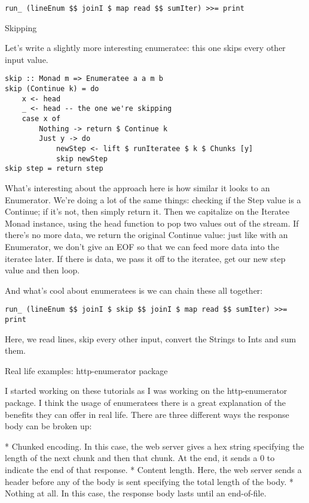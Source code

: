 \begin{lstlisting}
run_ (lineEnum $$ joinI $ map read $$ sumIter) >>= print
\end{lstlisting}

Skipping

Let's write a slightly more interesting enumeratee: this one skips every other input value.

\begin{lstlisting}
skip :: Monad m => Enumeratee a a m b
skip (Continue k) = do
    x <- head
    _ <- head -- the one we're skipping
    case x of
        Nothing -> return $ Continue k
        Just y -> do
            newStep <- lift $ runIteratee $ k $ Chunks [y]
            skip newStep
skip step = return step
\end{lstlisting}

What's interesting about the approach here is how similar it looks to an Enumerator. We're doing a lot of the same things: checking if the Step value is a Continue; if it's not, then simply return it. Then we capitalize on the Iteratee Monad instance, using the head function to pop two values out of the stream. If there's no more data, we return the original Continue value: just like with an Enumerator, we don't give an EOF so that we can feed more data into the iteratee later. If there is data, we pass it off to the iteratee, get our new step value and then loop.

And what's cool about enumeratees is we can chain these all together:

\begin{lstlisting}
run_ (lineEnum $$ joinI $ skip $$ joinI $ map read $$ sumIter) >>= print
\end{lstlisting}

Here, we read lines, skip every other input, convert the Strings to Ints and sum them.

Real life examples: http-enumerator package

I started working on these tutorials as I was working on the http-enumerator package. I think the usage of enumeratees there is a great explanation of the benefits they can offer in real life. There are three different ways the response body can be broken up:

* Chunked encoding. In this case, the web server gives a hex string specifying the length of the next chunk and then that chunk. At the end, it sends a 0 to indicate the end of that response.
* Content length. Here, the web server sends a header before any of the body is sent specifying the total length of the body.
* Nothing at all. In this case, the response body lasts until an end-of-file.

